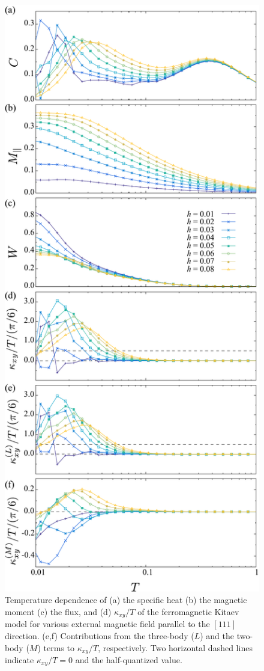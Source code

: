 \documentclass[twocolumn,superscriptaddress,showpacs, longbibliography, aps, prb]{revtex4-2}
\begin{document}
\begin{figure}
\begin{center}
    \includegraphics[width=0.9\linewidth]{Figs/plot_CMWkT.pdf}
  \end{center}
  \caption{Temperature dependence of (a) the specific heat (b) the magnetic moment (c) the flux, and (d) $\kappa_{xy}/T$ of the ferromagnetic Kitaev model for various external magnetic field parallel to the $[111]$ direction. (e,f) Contributions from the three-body ($L$) and the two-body ($M$) terms to $\kappa_{xy}/T$, respectively. Two horizontal dashed lines indicate $\kappa_{xy}/T = 0$ and the half-quantized value.
  }
  \label{fig:CMF_pure}
\end{figure}
\end{document}
